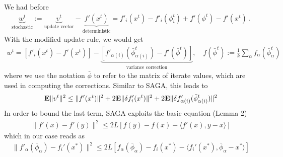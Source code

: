 \documentclass{article}
\newcommand{\E}{{\bf E}}
\begin{document}
We had before 
\begin{align}
\underbrace{w^t}_{\text{stochastic}} 
:= \underbrace{v^t}_{\text{update vector}}
-  \underbrace{f'(x^t)}_{\text{deterministic}} = f'_i(x^t) - f'_i(\phi^t_i) + f'(\phi^t) - f'(x^t) \,. 
\end{align}
With the modified update rule, we would get 
\begin{align}
w^t = \left[ f'_i(x^t) - f'(x^t) \right] - 
\underbrace{\left[ f'_{\alpha(i)}(\bar\phi^t_{\alpha(i)}) - f'(\bar \phi^t) \right]}_{\text{variance correction}}, \quad 
f(\bar \phi^t) := \frac 1k \sum_\alpha f_\alpha(\bar\phi_\alpha^t)
\end{align}
where we use the notation $\bar \phi$ to refer to the matrix of iterate values, which are used in computing the corrections. Similar to SAGA, this leads to  
\begin{align}
\E \| v^t \|^2 \leq \| f'(x^t) \|^2 + 2 \E \| \delta f'_i(x^t)\|^2 + 2 \E \|  \delta f'_{\alpha(i)}(\bar \phi_{\alpha(i)}^t)\|^2
\end{align}
In order to bound the last term, SAGA exploits the basic equation (Lemma 2)
\begin{align}
\| f'(x) - f'(y) \|^2 \leq 2L\left[ f(y) - f(x) - \langle f'(x), y-x \rangle \right] 
\end{align}
which in our case reads as 
\begin{align}
\| f'_\alpha(\bar \phi_\alpha)  - f_i'(x^*) \|^2 \leq 2L\left[ f_\alpha(\bar \phi_\alpha) - f_i(x^*) - \langle f_i'(x^*), \bar \phi_\alpha -x^* \rangle \right] 
\end{align}
\end{document}
